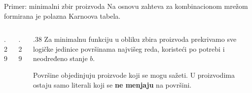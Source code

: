 \begin{frame}[label=02-s043]{Primer: minimalni zbir proizvoda}
\setlength{\parskip}{0pt}
Na osnovu zahteva za kombinacionom mrežom formirana je polazna Karnoova tabela.
\par\vspace{1.5mm}
\begin{columns}[T,onlytextwidth]
\begin{column}{.29\textwidth}\centering
\par\vspace{2mm}

\end{column}
\begin{column}{.29\textwidth}\centering
\par\vspace{2mm}

\end{column}
\begin{column}{.38\textwidth}
Za minimalnu funkciju u obliku zbira proizvoda prekrivamo sve logičke jedinice površinama najvišeg reda, koristeći po potrebi i neodređeno stanje \(b\).
\par\vspace{1.5mm}
Površine objedinjuju proizvode koji se mogu sažeti. U proizvodima ostaju samo literali koji se \alert{\textbf{ne menjaju}} na površini.
\end{column}
\end{columns}
\par\vspace{2mm}
\par{}
\end{frame}
